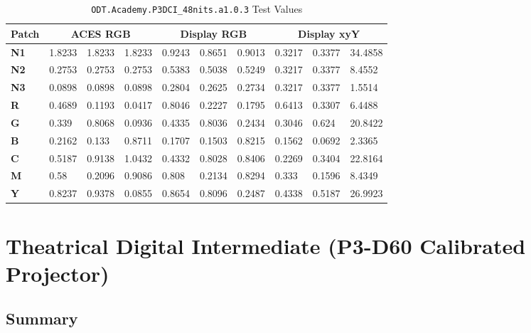 \begin{table}[ht!]
    \centering
    \begin{tabular}{|l|l|l|l|l|l|l|l|l|l|}
        \hline
        \multicolumn{1}{|c|}{\textbf{Patch}} & \multicolumn{3}{c|}{\textbf{ACES RGB}} & \multicolumn{3}{c|}{\textbf{Display RGB}} & \multicolumn{3}{c|}{\textbf{Display xyY}} \\ \hline
        \textbf{N1} & 1.8233 & 1.8233 & 1.8233 & 0.9243 & 0.8651 & 0.9013 & 0.3217 & 0.3377 & 34.4858 \\ \hline
        \textbf{N2} & 0.2753 & 0.2753 & 0.2753 & 0.5383 & 0.5038 & 0.5249 & 0.3217 & 0.3377 & 8.4552  \\ \hline
        \textbf{N3} & 0.0898 & 0.0898 & 0.0898 & 0.2804 & 0.2625 & 0.2734 & 0.3217 & 0.3377 & 1.5514  \\ \hline
        \textbf{R}  & 0.4689 & 0.1193 & 0.0417 & 0.8046 & 0.2227 & 0.1795 & 0.6413 & 0.3307 & 6.4488  \\ \hline
        \textbf{G}  & 0.339  & 0.8068 & 0.0936 & 0.4335 & 0.8036 & 0.2434 & 0.3046 & 0.624  & 20.8422 \\ \hline
        \textbf{B}  & 0.2162 & 0.133  & 0.8711 & 0.1707 & 0.1503 & 0.8215 & 0.1562 & 0.0692 & 2.3365  \\ \hline
        \textbf{C}  & 0.5187 & 0.9138 & 1.0432 & 0.4332 & 0.8028 & 0.8406 & 0.2269 & 0.3404 & 22.8164 \\ \hline
        \textbf{M}  & 0.58   & 0.2096 & 0.9086 & 0.808  & 0.2134 & 0.8294 & 0.333  & 0.1596 & 8.4349  \\ \hline
        \textbf{Y}  & 0.8237 & 0.9378 & 0.0855 & 0.8654 & 0.8096 & 0.2487 & 0.4338 & 0.5187 & 26.9923 \\ \hline
    \end{tabular}
    \caption[Theatrical DI (P3DCI) - Test Values]{ \texttt{ODT.Academy.P3DCI\_48nits.a1.0.3} Test Values}
    \label{tab:testValues-p3dci}
\end{table}


\clearpage
\section{Theatrical Digital Intermediate (P3-D60 Calibrated Projector)}
\label{sec:ot-app-p3d60}

\subsection{Summary}
\label{subsec:summary-p3d60}

